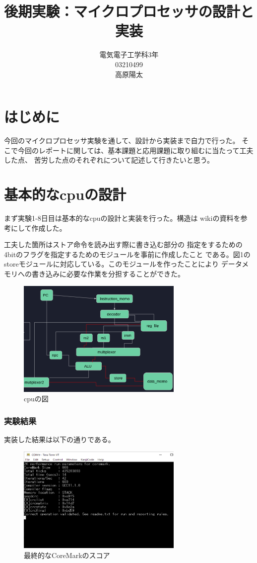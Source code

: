 \documentclass[12pt]{jreport}
\title{後期実験：マイクロプロセッサの設計と実装}
\author{電気電子工学科3年\\03210499\\高原陽太}
\begin{document}
  \maketitle
  \part{はじめに}

  今回のマイクロプロセッサ実験を通して、設計から実装まで自力で行った。
  そこで今回のレポートに関しては、基本課題と応用課題に取り組むに当たって工夫した点、
  苦労した点のそれぞれについて記述して行きたいと思う。
  
  \part{基本的なcpuの設計}

  まず実験1-8日目は基本的なcpuの設計と実装を行った。構造は
  wikiの資料を参考にして作成した。
  
  工夫した箇所はストア命令を読み出す際に書き込む部分の
  指定をするための4bitのフラグを指定するためのモジュールを事前に作成したこと
  である。図1のstoreモジュールに対応している。このモジュールを作ったことにより
  データメモリへの書き込みに必要な作業を分担することができた。
  \begin{figure}[htbp]
    \centering
    \includegraphics[width=8cm]{picture/cpu.png}
    \caption{cpuの図}
  \end{figure}

  
  \section{実験結果}
  実装した結果は以下の通りである。
  \begin{figure}[htbp]
    \centering
    \includegraphics[width=8cm]{picture/score.png}
    \caption{最終的なCoreMarkのスコア}
  \end{figure}
\end{document}
